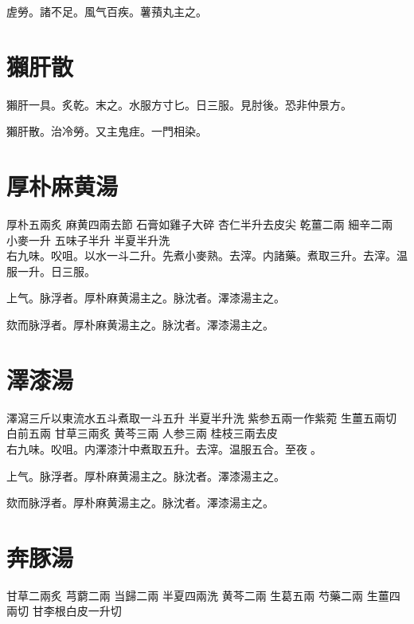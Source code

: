 虗勞。諸不足。風气百疾。薯蕷丸主之。

\section{獺肝散}

獺肝一具。炙乾。末之。水服方寸匕。日三服。{\scriptsize 見肘後。恐非仲景方。}{\wuben}


獺肝散。治冷勞。又主鬼疰。一門相染。

\section{厚朴麻黄湯}

厚朴{\scriptsize 五兩炙} 麻黄{\scriptsize 四兩去節} 石膏{\scriptsize 如雞子大碎} 杏仁{\scriptsize 半升去皮尖} 乾薑{\scriptsize 二兩} 細辛{\scriptsize 二兩} 小麥{\scriptsize 一升} 五味子{\scriptsize 半升} 半夏{\scriptsize 半升洗}\\
右九味。㕮咀。以水一斗二升。先煮小麥熟。去滓。内諸藥。煮取三升。去滓。温服一升。日三服。

上气。脉浮者。厚朴麻黄湯主之。脉沈者。澤漆湯主之。{\wuben}

欬而脉浮者。厚朴麻黄湯主之。脉沈者。澤漆湯主之。{\dengben}

\section{澤漆湯}

澤瀉{\scriptsize 三斤以東流水五斗煮取一斗五升} 半夏{\scriptsize 半升洗} 紫参{\scriptsize 五兩一作紫菀} 生薑{\scriptsize 五兩切} 白前{\scriptsize 五兩} 甘草{\scriptsize 三兩炙} 黄芩{\scriptsize 三兩} 人参{\scriptsize 三兩} 桂枝{\scriptsize 三兩去皮}\\
右九味。㕮咀。内澤漆汁中煮取五升。去滓。温服五合。至夜{\sungtpii 𥁞}。

上气。脉浮者。厚朴麻黄湯主之。脉沈者。澤漆湯主之。{\wuben}

欬而脉浮者。厚朴麻黄湯主之。脉沈者。澤漆湯主之。{\dengben}

\section{奔豚湯}

甘草{\scriptsize 二兩{\khaaitp 炙}} 芎藭{\scriptsize 二兩} 当歸{\scriptsize 二兩} 半夏{\scriptsize 四兩{\khaaitp 洗}} 黄芩{\scriptsize 二兩} 生葛{\scriptsize 五兩} 芍藥{\scriptsize 二兩} 生薑{\scriptsize 四兩{\khaaitp 切}} 甘李根白皮{\scriptsize 一升{\khaaitp 切}}

